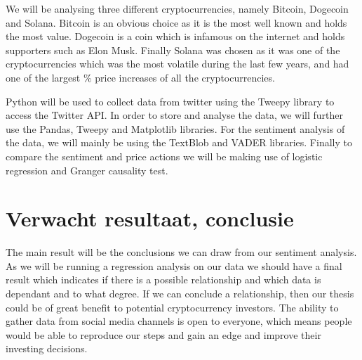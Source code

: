We will be analysing three different cryptocurrencies, namely Bitcoin, Dogecoin and Solana. Bitcoin is an obvious choice as it is the most well known and holds the most value. Dogecoin is a coin which is infamous on the internet and holds supporters such as Elon Musk. Finally Solana was chosen as it was one of the cryptocurrencies which was the most volatile during the last few years, and had one of the largest \% price increases of all the cryptocurrencies.

\noindent Python will be used to collect data from twitter using the Tweepy library to access the Twitter API. In order to store and analyse the data, we will further use the Pandas, Tweepy and Matplotlib libraries. For the sentiment analysis of the data, we will mainly be using the TextBlob and VADER libraries. Finally to compare the sentiment and price actions we will be making use of logistic regression and Granger causality test.


\section{Verwacht resultaat, conclusie}%
\label{sec:verwachte_resultaten}

\noindent The main result will be the conclusions we can draw from our sentiment analysis. As we will be running a regression analysis on our data we should have a final result which indicates if there is a possible relationship and which data is dependant and to what degree. If we can conclude a relationship, then our thesis could be of great benefit to potential cryptocurrency investors. The ability to gather data from social media channels is open to everyone, which means people would be able to reproduce our steps and gain an edge and improve their investing decisions. 


